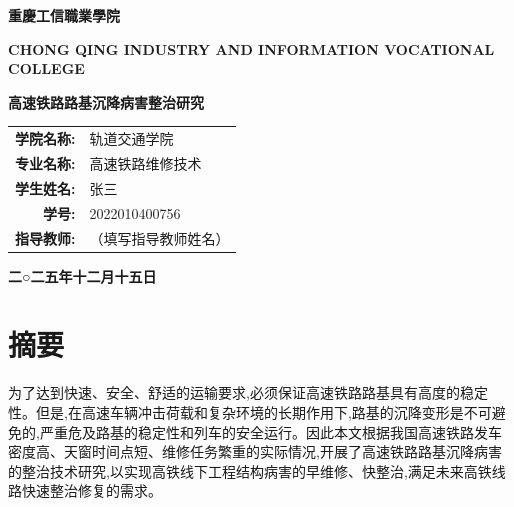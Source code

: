 \documentclass[a4paper,12pt]{ctexrep}
\begin{document}
\begin{titlepage}
    \centering
    \vspace*{1cm}
    {\Huge \textbf{重慶工信職業學院} \par}
    \vspace{0.5cm}
    {\Large \textbf{CHONG QING INDUSTRY AND INFORMATION VOCATIONAL COLLEGE} \par}
    
    \vspace{3cm}
    
    {\Huge \textbf{高速铁路路基沉降病害整治研究} \par}
    
    \vspace{4cm}
    
    \begin{large}
        \begin{tabular}{rl}
            \textbf{学院名称:} & 轨道交通学院 \\
            \textbf{专业名称:} & 高速铁路维修技术 \\
            \textbf{学生姓名:} & 张三 \\
            \textbf{学号:}   & 2022010400756 \\
            \textbf{指导教师:} & （填写指导教师姓名） \\
        \end{tabular}
    \end{large}
    
    \vspace{3cm}
    
    {\Large \textbf{二○二五年十二月十五日} \par}
    
\end{titlepage}

\chapter*{摘要}

为了达到快速、安全、舒适的运输要求,必须保证高速铁路路基具有高度的稳定性。但是,在高速车辆冲击荷载和复杂环境的长期作用下,路基的沉降变形是不可避免的,严重危及路基的稳定性和列车的安全运行。因此本文根据我国高速铁路发车密度高、天窗时间点短、维修任务繁重的实际情况,开展了高速铁路路基沉降病害的整治技术研究,以实现高铁线下工程结构病害的早维修、快整治,满足未来高铁线路快速整治修复的需求。
\end{document}
